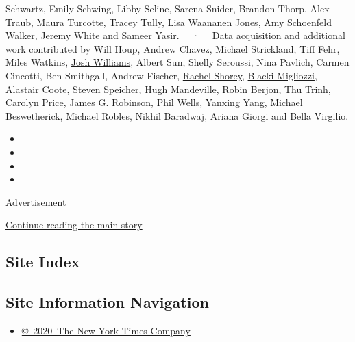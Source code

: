 Schwartz, Emily Schwing, Libby Seline, Sarena Snider, Brandon Thorp,
Alex Traub, Maura Turcotte, Tracey Tully, Lisa Waananen Jones, Amy
Schoenfeld Walker, Jeremy White and
\href{https://www.nytimes.com/by/sameer-yasir}{Sameer Yasir}. ~~·~~ Data
acquisition and additional work contributed by Will Houp, Andrew Chavez,
Michael Strickland, Tiff Fehr, Miles Watkins,
\href{https://www.nytimes.com/by/josh-williams}{Josh Williams}, Albert
Sun, Shelly Seroussi, Nina Pavlich, Carmen Cincotti, Ben Smithgall,
Andrew Fischer, \href{https://www.nytimes.com/by/rachel-shorey}{Rachel
Shorey}, \href{https://www.nytimes.com/by/blacki-migliozzi}{Blacki
Migliozzi}, Alastair Coote, Steven Speicher, Hugh Mandeville, Robin
Berjon, Thu Trinh, Carolyn Price, James G. Robinson, Phil Wells, Yanxing
Yang, Michael Beswetherick, Michael Robles, Nikhil Baradwaj, Ariana
Giorgi and Bella Virgilio.

\begin{itemize}
\item
\item
\item
\item
\end{itemize}

Advertisement

\protect\hyperlink{after-bottom}{Continue reading the main story}

\hypertarget{site-index}{%
\subsection{Site Index}\label{site-index}}

\hypertarget{site-information-navigation}{%
\subsection{Site Information
Navigation}\label{site-information-navigation}}

\begin{itemize}
\tightlist
\item
  \href{https://help.nytimes.com/hc/en-us/articles/115014792127-Copyright-notice}{©~2020~The
  New York Times Company}
\end{itemize}

